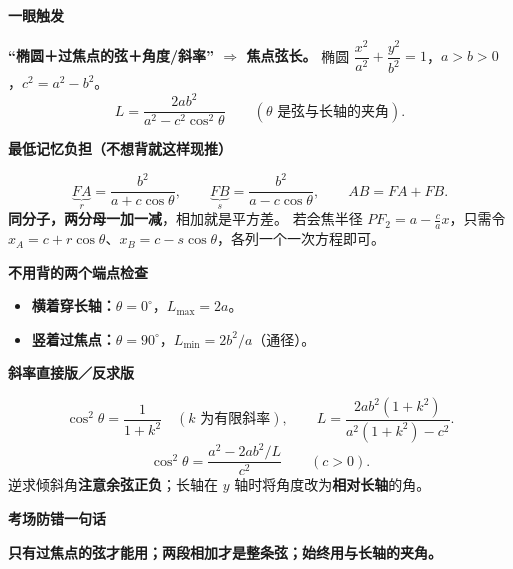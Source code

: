 \clearpage
\begin{summarybox}

\textbf{\textcolor{CSummary}{一眼触发}}

\textbf{``椭圆＋过焦点的弦＋角度/斜率'' $\Longrightarrow$ 焦点弦长。}
椭圆 $\dfrac{x^2}{a^2}+\dfrac{y^2}{b^2}=1$，$a>b>0$，$c^2=a^2-b^2$。
\[
 \boxed{L=\frac{2ab^2}{a^2-c^2\cos^2\theta}}
 \qquad\left(\theta\text{ 是弦与长轴的夹角}\right).
\]

\textbf{\textcolor{CSummary}{最低记忆负担（不想背就这样现推）}}

\[
 \underbrace{FA}_{r}=\frac{b^2}{a+c\cos\theta},\qquad
 \underbrace{FB}_{s}=\frac{b^2}{a-c\cos\theta},\qquad
 \boxed{AB=FA+FB}.
\]
\textbf{同分子，两分母一加一减}，相加就是平方差。
若会焦半径 $PF_2=a-\frac ca x$，只需令
$x_A=c+r\cos\theta$、$x_B=c-s\cos\theta$，各列一个一次方程即可。

\medskip
\textbf{\textcolor{CSummary}{不用背的两个端点检查}}

\begin{itemize}[leftmargin=*,itemsep=0.35em,topsep=0.35em]
 \item \textbf{横着穿长轴：}$\theta=0^\circ$，$L_{\max}=2a$。
 \item \textbf{竖着过焦点：}$\theta=90^\circ$，$L_{\min}=2b^2/a$（通径）。
\end{itemize}

\medskip
\textbf{\textcolor{CSummary}{斜率直接版／反求版}}

\[
 \cos^2\theta=\frac1{1+k^2}\quad(k\text{ 为有限斜率}),\qquad
 L=\frac{2ab^2(1+k^2)}{a^2(1+k^2)-c^2}.
\]
\[
 \cos^2\theta=\frac{a^2-2ab^2/L}{c^2}\qquad(c>0).
\]
逆求倾斜角\textbf{注意余弦正负}；长轴在 $y$ 轴时将角度改为\textbf{相对长轴}的角。

\medskip
\textbf{\textcolor{CSummary}{考场防错一句话}}

\textbf{只有过焦点的弦才能用；两段相加才是整条弦；始终用与长轴的夹角。}

\end{summarybox}

